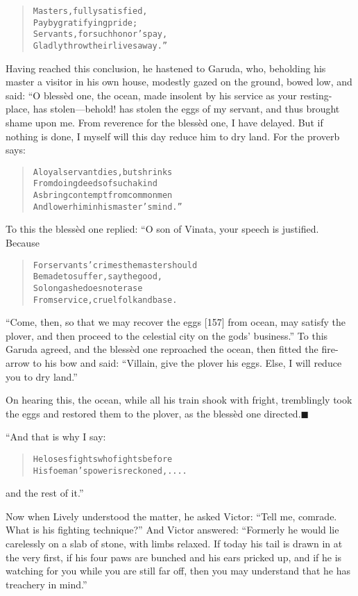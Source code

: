 \documentclass[article, twoside, 14pt]{memoir}
\newcommand{\qed}{\hfill \ensuremath{\blacksquare}}
\renewenvironment{verbatim}{%
\begin{quote}%
\vskip -10pt%
\begin{alltt}\normalfont\large}{\end{alltt}%
\end{quote}%
\vskip -10pt
} %
\begin{document}
\begin{verbatim}
Masters, fully satisfied,
Pay by gratifying pride;
Servants, for such honor's pay,
Gladly throw their lives away.”
\end{verbatim}
Having reached this conclusion, he hastened to Garuda, who,
beholding his master a visitor in his own house, modestly gazed on
the ground, bowed low, and said: “O blessèd one, the ocean, made
insolent by his service as your resting-place, has stolen---behold!
has stolen the eggs of my servant, and thus brought shame upon me.
From reverence for the blessèd one, I have delayed. But if nothing
is done, I myself will this day reduce him to dry land. For the
proverb says:

\begin{verbatim}
A loyal servant dies, but shrinks
    From doing deeds of such a kind
As bring contempt from common men
    And lower him in his master's mind.”
\end{verbatim}
To this the blessèd one replied: “O son of Vinata, your speech is
justified. Because

\begin{verbatim}
For servants' crimes the master should
Be made to suffer, say the good,
So long as he does not erase
From service, cruel folk and base.
\end{verbatim}
``Come, then, so that we may recover the eggs [157] from ocean, may satisfy the plover, and then proceed to the celestial city on the gods' business.''
To this Garuda agreed, and the blessèd one reproached the ocean,
then fitted the fire-arrow to his bow and said:
``Villain, give the plover his eggs. Else, I will reduce you to dry land.''

On hearing this, the ocean, while all his train shook with fright,
tremblingly took the eggs and restored them to the plover, as the
blessèd one directed.\hyperref[s18]{\qed}

“And that is why I say:

\begin{verbatim}
He loses fights who fights before
    His foeman's power is reckoned, ....
\end{verbatim}
and the rest of it.”

Now when Lively understood the matter, he asked Victor:
``Tell me, comrade. What is his fighting technique?'' And Victor
answered:
``Formerly he would lie carelessly on a slab of stone, with limbs relaxed. If today his tail is drawn in at the very first, if his four paws are bunched and his ears pricked up, and if he is watching for you while you are still far off, then you may understand that he has treachery in mind.''
\end{document}
